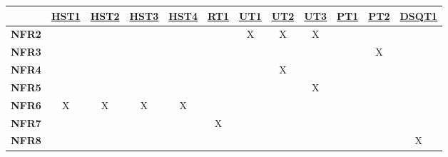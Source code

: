 \documentclass[12pt, titlepage]{article}
\begin{document}
\begin{table}[H]
  \centering
  \begin{tabular}{|c|c|c|c|c|c|c|c|c|c|c|c|}
    \hline
                   & \hyperref[HST1]{HST1} & \hyperref[HST2]{HST2} & \hyperref[HST3]{HST3} & \hyperref[HST4]{HST4} & \hyperref[RT1]{RT1} & \hyperref[UT1]{UT1} & \hyperref[UT2]{UT2} & \hyperref[UT3]{UT3} & \hyperref[PT1]{PT1} & \hyperref[PT2]{PT2} & \hyperref[DSQT1]{DSQT1} \\
    \hline
    \textbf{NFR2}  &                       &                       &                       &                       &                     & X                   & X                   & X                   &                     &                     &                         \\ \hline
    \textbf{NFR3}  &                       &                       &                       &                       &                     &                     &                     &                     &                     & X                   &                         \\ \hline
    \textbf{NFR4}  &                       &                       &                       &                       &                     &                     & X                   &                     &                     &                     &                         \\ \hline
    \textbf{NFR5}  &                       &                       &                       &                       &                     &                     &                     & X                   &                     &                     &                         \\ \hline
    \textbf{NFR6}  & X                     & X                     & X                     & X                     &                     &                     &                     &                     &                     &                     &                         \\ \hline
    \textbf{NFR7}  &                       &                       &                       &                       & X                   &                     &                     &                     &                     &                     &                         \\ \hline
    \textbf{NFR8}  &                       &                       &                       &                       &                     &                     &                     &                     &                     &                     & X                       \\ \hline

\end{tabular}
\end{table}
\end{document}
